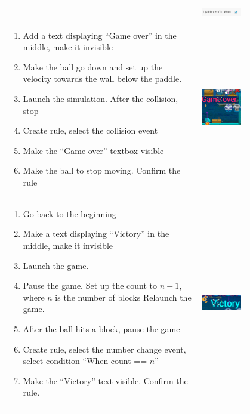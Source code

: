 \documentclass[12pt]{article} %
\begin{document}
\begin{longtable}{m{0.8\linewidth} m{2in}}
\begin{enumerate}
\setcounter{tempcounter}{\value{enumi}}
\end{enumerate}
&
\centerline{\includegraphics[width=2in]{captures/brick8}}
\\
\begin{enumerate}
\setcounter{enumi}{\value{tempcounter}}
\item Add a text displaying ``Game over'' in the middle, make it invisible
\item Make the ball go down and set up the velocity towards the wall below the
paddle.
\item Launch the simulation. After the collision, stop
\item Create rule, select the collision event
\item Make the ``Game over'' textbox visible
\item Make the ball to stop moving. Confirm the rule
\setcounter{tempcounter}{\value{enumi}}
\end{enumerate}
&
\centerline{\includegraphics[width=2in]{captures/brick9}}
\\
\begin{enumerate}
\setcounter{enumi}{\value{tempcounter}}
\item Go back to the beginning
\item Make a text displaying ``Victory'' in the middle, make it invisible
\item Launch the game.
\item Pause the game. Set up the count to $n-1$, where $n$ is the number of
blocks Relaunch the game.
\item After the ball hits a block, pause the game
\item Create rule, select the number change event, select condition ``When count
== $n$''
\item Make the ``Victory'' text visible. Confirm the rule.
\end{enumerate}
&

\centerline{\includegraphics[width=2in]{captures/brick10}}
\end{longtable}
\end{document}
